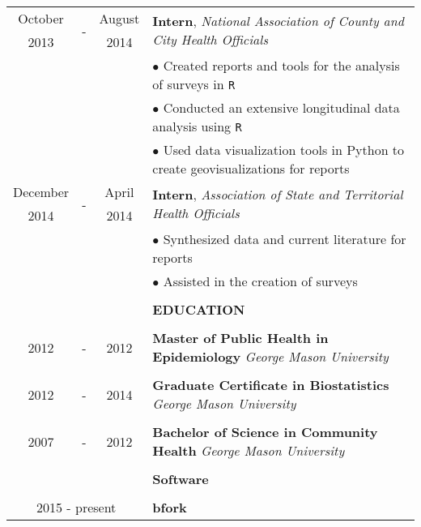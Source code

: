 \documentclass[10pt]{article}
\begin{document}
\begin{table}[ht]
\begin{tabular}{@{\hspace{0mm}}c@{\hspace{1mm}}c@{\hspace{3mm}}cl}
            October & \multirow{2}{*}{-} & August & \multirow{2}{*}{\textbf{Intern}, \textit{National Association of County and City Health Officials}}\\
            2013 & & 2014 &\\
            & & & $\bullet$ Created reports and tools for the analysis of surveys in \texttt{R}\\
            & & & $\bullet$ Conducted an extensive longitudinal data analysis using \texttt{R}\\
            & & & $\bullet$ Used data visualization tools in Python to create geovisualizations for reports\\
            December & \multirow{2}{*}{-} & April & \multirow{2}{*}{\textbf{Intern}, \textit{Association of State and Territorial Health Officials}}\\
            2014 & & 2014 &\\
            & & & $\bullet$ Synthesized data and current literature for reports\\
            & & & $\bullet$ Assisted in the creation of surveys\\
            & & & \color{maroon}{\rule{14cm}{0.75pt}}\\
            & & & \large{\textbf{EDUCATION}}\\
            & & & \color{maroon}{\rule{14cm}{0.75pt}}\\
            2012 & - & 2012 & \textbf{Master of Public Health in Epidemiology} \textit{George Mason University}\\
            \\
            2012 & - & 2014 & \textbf{Graduate Certificate in Biostatistics} \textit{George Mason University}\\
            \\
            2007 & - & 2012 & \textbf{Bachelor of Science in Community Health} \textit{George Mason University}\\
            & & & \color{maroon}{\rule{14cm}{0.75pt}}\\
            & & & \large{\textbf{Software}}\\
            & & & \color{maroon}{\rule{14cm}{0.75pt}}\\
            \multicolumn{3}{c}{\multirow{3}{*}{2015 - present}} & \textbf{bfork}\\

\end{tabular}
\end{table}
\end{document}
